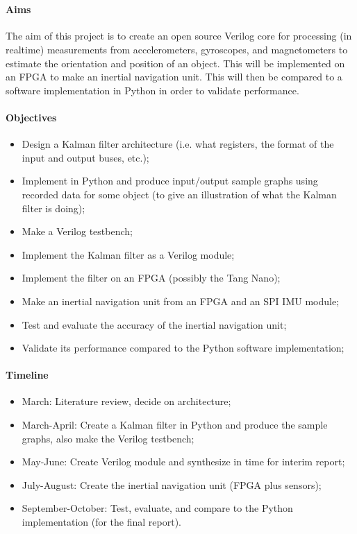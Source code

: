 \documentclass[12pt]{article}
\begin{document}
 \\

\paragraph{Aims}

The aim of this project is to create an open source Verilog core for processing (in realtime) measurements from accelerometers, gyroscopes, and magnetometers to estimate the orientation and position of an object. This will be implemented on an FPGA to make an inertial navigation unit. This will then be compared to a software implementation in Python in order to validate performance.

\paragraph{Objectives}

\begin{itemize}[noitemsep]
\item Design a Kalman filter architecture (i.e. what registers, the format of the input and output buses, etc.);
\item Implement in Python and produce input/output sample graphs using recorded data for some object (to give an illustration of what the Kalman filter is doing);
\item Make a Verilog testbench;
\item Implement the Kalman filter as a Verilog module;
\item Implement the filter on an FPGA (possibly the Tang Nano);
\item Make an inertial navigation unit from an FPGA and an SPI IMU module;
\item Test and evaluate the accuracy of the inertial navigation unit;
\item Validate its performance compared to the Python software implementation;
\end{itemize}

\paragraph{Timeline}
\begin{itemize}[noitemsep]
\item March: Literature review, decide on architecture;
\item March-April: Create a Kalman filter in Python and produce the sample graphs, also make the Verilog testbench;
\item May-June: Create Verilog module and synthesize in time for interim report;
\item July-August: Create the inertial navigation unit (FPGA plus sensors);
\item September-October: Test, evaluate, and compare to the Python implementation (for the final report).
\end{itemize}
\end{document}
